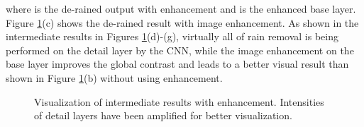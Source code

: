 \documentclass[journal]{IEEEtran}
\begin{document}
where  is the de-rained output with enhancement and  is the enhanced base layer. Figure \ref{fig.enhance_intermediate}(c) shows the de-rained result with image enhancement. As shown in the intermediate results in Figures \ref{fig.enhance_intermediate}(d)-(g), virtually all of rain removal is being performed on the detail layer by the CNN, while the image enhancement on the base layer improves the global contrast and leads to a better visual result than shown in Figure \ref{fig.enhance_intermediate}(b) without using enhancement.
\begin{figure}[t!]
\centering
{}
\caption{Visualization of intermediate results with enhancement. Intensities of detail layers have been amplified for better visualization.} \label{fig.enhance_intermediate}
\end{figure}
\end{document}
